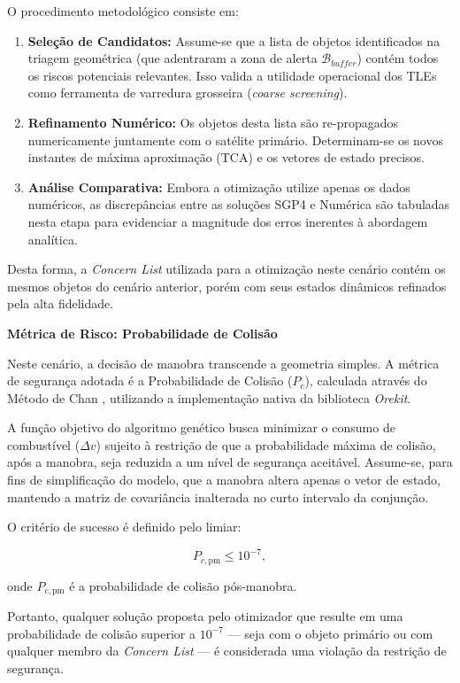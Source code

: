 O procedimento metodológico consiste em:
\begin{enumerate}
    \item \textbf{Seleção de Candidatos:} Assume-se que a lista de objetos identificados na triagem geométrica (que adentraram a zona de alerta $\mathcal{B}_{buffer}$) contém todos os riscos potenciais relevantes. Isso valida a utilidade operacional dos TLEs como ferramenta de varredura grosseira (\textit{coarse screening}).
    \item \textbf{Refinamento Numérico:} Os objetos desta lista são re-propagados numericamente juntamente com o satélite primário. Determinam-se os novos instantes de máxima aproximação (TCA) e os vetores de estado precisos.
    \item \textbf{Análise Comparativa:} Embora a otimização utilize apenas os dados numéricos, as discrepâncias entre as soluções SGP4 e Numérica são tabuladas nesta etapa para evidenciar a magnitude dos erros inerentes à abordagem analítica.
\end{enumerate}

Desta forma, a \textit{Concern List} utilizada para a otimização neste cenário contém os mesmos objetos do cenário anterior, porém com seus estados dinâmicos refinados pela alta fidelidade.

\textbf{Métrica de Risco: Probabilidade de Colisão}

Neste cenário, a decisão de manobra transcende a geometria simples. A métrica de segurança adotada é a Probabilidade de Colisão ($P_c$), calculada através do Método de Chan \cite{Chan1997}, utilizando a implementação nativa da biblioteca \textit{Orekit}.

A função objetivo do algoritmo genético busca minimizar o consumo de combustível ($\Delta v$) sujeito à restrição de que a probabilidade máxima de colisão, após a manobra, seja reduzida a um nível de segurança aceitável. Assume-se, para fins de simplificação do modelo, que a manobra altera apenas o vetor de estado, mantendo a matriz de covariância inalterada no curto intervalo da conjunção.

O critério de sucesso é definido pelo limiar:

\begin{equation}
    P_{c, \text{pm}} \leq 10^{-7},
\end{equation}

\noindent onde $P_{c, \text{pm}}$ é a probabilidade de colisão pós-manobra.

Portanto, qualquer solução proposta pelo otimizador que resulte em uma probabilidade de colisão superior a $10^{-7}$ — seja com o objeto primário ou com qualquer membro da \textit{Concern List} — é considerada uma violação da restrição de segurança.

